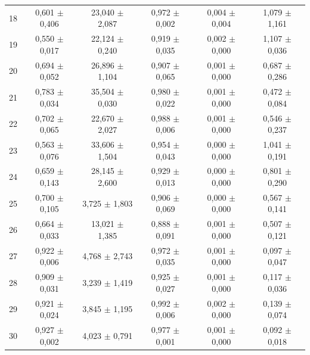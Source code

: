 \begin{tabular}{l c c c c c}
18 & 0,601 $\pm$ 0,406 & 23,040 $\pm$ 2,087 & 0,972 $\pm$ 0,002 & 0,004 $\pm$ 0,004 & 1,079 $\pm$ 1,161 \\
19 & 0,550 $\pm$ 0,017 & 22,124 $\pm$ 0,240 & 0,919 $\pm$ 0,035 & 0,002 $\pm$ 0,000 & 1,107 $\pm$ 0,036 \\
20 & 0,694 $\pm$ 0,052 & 26,896 $\pm$ 1,104 & 0,907 $\pm$ 0,065 & 0,001 $\pm$ 0,000 & 0,687 $\pm$ 0,286 \\
21 & 0,783 $\pm$ 0,034 & 35,504 $\pm$ 0,030 & 0,980 $\pm$ 0,022 & 0,001 $\pm$ 0,000 & 0,472 $\pm$ 0,084 \\
22 & 0,702 $\pm$ 0,065 & 22,670 $\pm$ 2,027 & 0,988 $\pm$ 0,006 & 0,001 $\pm$ 0,000 & 0,546 $\pm$ 0,237 \\
23 & 0,563 $\pm$ 0,076 & 33,606 $\pm$ 1,504 & 0,954 $\pm$ 0,043 & 0,000 $\pm$ 0,000 & 1,041 $\pm$ 0,191 \\
24 & 0,659 $\pm$ 0,143 & 28,145 $\pm$ 2,600 & 0,929 $\pm$ 0,013 & 0,000 $\pm$ 0,000 & 0,801 $\pm$ 0,290 \\
25 & 0,700 $\pm$ 0,105 & 3,725 $\pm$ 1,803 & 0,906 $\pm$ 0,069 & 0,000 $\pm$ 0,000 & 0,567 $\pm$ 0,141 \\
26 & 0,664 $\pm$ 0,033 & 13,021 $\pm$ 1,385 & 0,888 $\pm$ 0,091 & 0,001 $\pm$ 0,000 & 0,507 $\pm$ 0,121 \\
27 & 0,922 $\pm$ 0,006 & 4,768 $\pm$ 2,743 & 0,972 $\pm$ 0,035 & 0,001 $\pm$ 0,000 & 0,097 $\pm$ 0,047 \\
28 & 0,909 $\pm$ 0,031 & 3,239 $\pm$ 1,419 & 0,925 $\pm$ 0,027 & 0,001 $\pm$ 0,000 & 0,117 $\pm$ 0,036 \\
29 & 0,921 $\pm$ 0,024 & 3,845 $\pm$ 1,195 & 0,992 $\pm$ 0,006 & 0,002 $\pm$ 0,000 & 0,139 $\pm$ 0,074 \\
30 & 0,927 $\pm$ 0,002 & 4,023 $\pm$ 0,791 & 0,977 $\pm$ 0,001 & 0,001 $\pm$ 0,000 & 0,092 $\pm$ 0,018 \\
\hline 
 \end{tabular}
